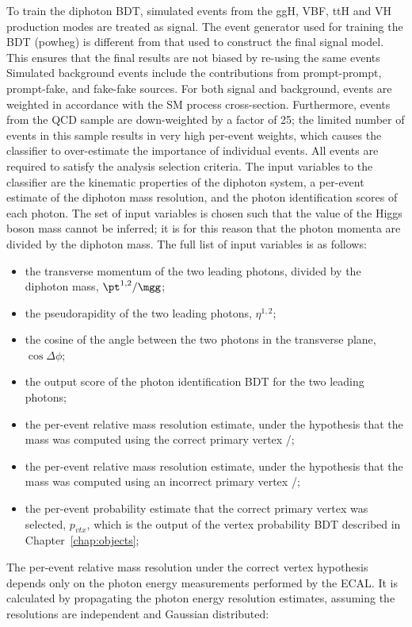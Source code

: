 To train the diphoton BDT, simulated events from the ggH, VBF, ttH 
and VH production modes are treated as signal. 
The event generator used for training the BDT (powheg) is different from that used to construct
the final signal model.
This ensures that the final results are not biased by re-using the same events
Simulated background events include the contributions from prompt-prompt, prompt-fake, 
and fake-fake sources.
For both signal and background, 
events are weighted in accordance with the SM process cross-section.
Furthermore, events from the QCD sample are down-weighted by a factor of 25;
the limited number of events in this sample results in very high per-event weights, 
which causes the classifier to over-estimate the importance of individual events.
All events are required to satisfy the analysis selection criteria.
The input variables to the classifier are the kinematic properties of the diphoton system, 
a per-event estimate of the diphoton mass resolution, 
and the photon identification scores of each photon.
The set of input variables is chosen such that the value of the Higgs boson mass cannot be inferred;
it is for this reason that the photon momenta are divided by the diphoton mass.
The full list of input variables is as follows:
\begin{itemize}
\item the transverse momentum of the two leading photons, divided by the diphoton mass, $\pt^{1,2}/\mgg$;
\item the pseudorapidity of the two leading photons, $\eta^{1,2}$;
\item the cosine of the angle between the two photons in the transverse plane, $\cos{\Delta\phi}$;
\item the output score of the photon identification BDT for the two leading photons;
\item the per-event relative mass resolution estimate, 
      under the hypothesis that the mass was computed using the correct primary vertex \srv/\mgg;
\item the per-event relative mass resolution estimate, 
      under the hypothesis that the mass was computed using an incorrect primary vertex \swv/\mgg;
\item the per-event probability estimate that the correct primary vertex was selected, $p_{vtx}$,
      which is the output of the vertex probability BDT described in Chapter~\ref{chap:objects};
\end{itemize}

The per-event relative mass resolution under the correct vertex hypothesis 
depends only on the photon energy measurements performed by the ECAL.
It is calculated by propagating the photon energy resolution estimates, 
assuming the resolutions are independent and Gaussian distributed:

